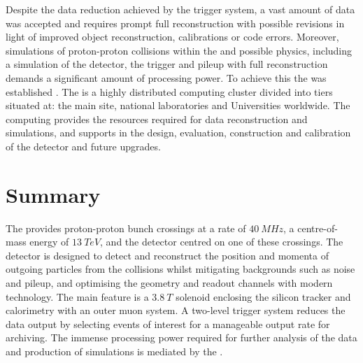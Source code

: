Despite the data reduction achieved by the \CMS trigger system, a vast amount of data was accepted and requires prompt full reconstruction with possible revisions in light of improved object reconstruction, calibrations or code errors. Moreover, simulations of proton-proton collisions within the \SM and possible \BSM physics, including a simulation of the detector, the trigger and pileup with full reconstruction demands a significant amount of processing power. To achieve this the \WLCG was established \cite{Bird:1695401}. The \WLCG is a highly distributed computing cluster divided into tiers situated at: the main \CERN site, national laboratories and Universities worldwide. The computing  provides the resources required for data reconstruction and simulations, and supports in the design, evaluation, construction and calibration of the detector and future upgrades.


\section{Summary}

The \LHC provides proton-proton bunch crossings at a rate of ${\SI{40}{MHz}}$, a centre-of-mass energy of ${\SI{13}{TeV}}$, and the \CMS detector centred on one of these crossings. The \CMS detector is designed to detect and reconstruct the position and momenta of outgoing particles from the collisions whilst mitigating backgrounds such as noise and pileup, and optimising the geometry and readout channels with modern technology. The main feature is a ${\SI{3.8}{T}}$ solenoid enclosing the silicon tracker and calorimetry with an outer muon system. A two-level trigger system reduces the data output by selecting events of interest for a manageable output rate for archiving.  The immense processing power required for further analysis of the data and production of simulations is mediated by the \WLCG.
